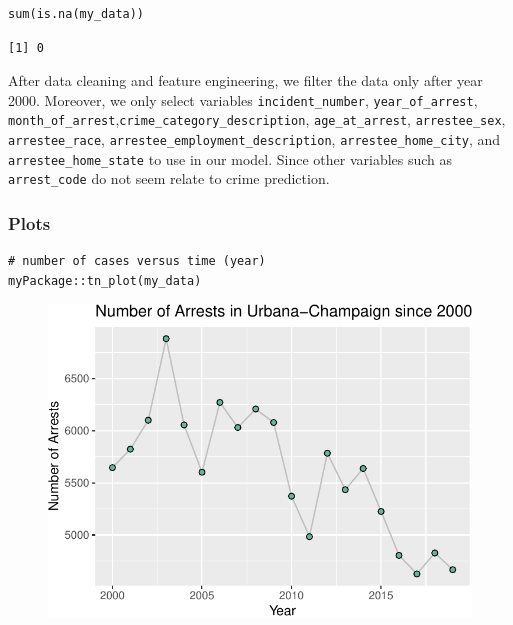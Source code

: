 \documentclass[
  article]{jss}
\begin{document}
\begin{verbatim}
sum(is.na(my_data))
\end{verbatim}

\begin{verbatim}
[1] 0
\end{verbatim}

After data cleaning and feature engineering, we filter the data only
after year 2000. Moreover, we only select variables
\texttt{incident\_number}, \texttt{year\_of\_arrest},
\texttt{month\_of\_arrest},\texttt{crime\_category\_description},
\texttt{age\_at\_arrest}, \texttt{arrestee\_sex},
\texttt{arrestee\_race}, \texttt{arrestee\_employment\_description},
\texttt{arrestee\_home\_city}, and \texttt{arrestee\_home\_state} to use
in our model. Since other variables such as \texttt{arrest\_code} do not
seem relate to crime prediction.

\hypertarget{plots}{%
\subsubsection{Plots}\label{plots}}

\begin{verbatim}
# number of cases versus time (year)
myPackage::tn_plot(my_data)
\end{verbatim}

\begin{figure}[H]

{\centering \includegraphics{final-report_files/figure-pdf/unnamed-chunk-8-1.pdf}

}

\end{figure}
\end{document}

